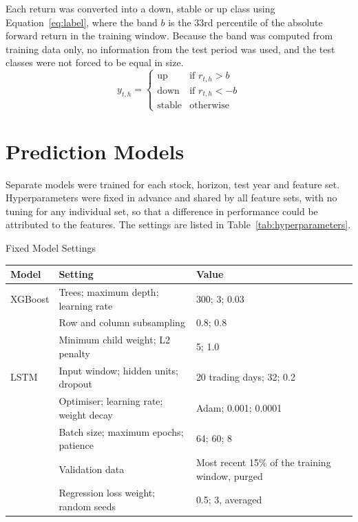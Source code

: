 Each return was converted into a down, stable or up class using Equation~\ref{eq:label}, where the band $b$ is the 33rd percentile of the absolute forward return in the training window. Because the band was computed from training data only, no information from the test period was used, and the test classes were not forced to be equal in size.
\begin{equation}
y_{t,h} =
\begin{cases}
\text{up} & \text{if } r_{t,h} > b \\
\text{down} & \text{if } r_{t,h} < -b \\
\text{stable} & \text{otherwise}
\end{cases}
\label{eq:label}
\end{equation}

\section{Prediction Models}
\label{sec:models}
Separate models were trained for each stock, horizon, test year and feature set. Hyperparameters were fixed in advance and shared by all feature sets, with no tuning for any individual set, so that a difference in performance could be attributed to the features. The settings are listed in Table~\ref{tab:hyperparameters}.

\begin{utptable}{Fixed Model Settings}
\label{tab:hyperparameters}
\begin{tabular}{@{}P{1.9cm}P{5.4cm}P{6.3cm}@{}}
\toprule
\textbf{Model} & \textbf{Setting} & \textbf{Value} \\
\midrule
XGBoost & Trees; maximum depth; learning rate & 300; 3; 0.03 \\
 & Row and column subsampling & 0.8; 0.8 \\
 & Minimum child weight; L2 penalty & 5; 1.0 \\
\midrule
LSTM & Input window; hidden units; dropout & 20 trading days; 32; 0.2 \\
 & Optimiser; learning rate; weight decay & Adam; 0.001; 0.0001 \\
 & Batch size; maximum epochs; patience & 64; 60; 8 \\
 & Validation data & Most recent 15\% of the training window, purged \\
 & Regression loss weight; random seeds & 0.5; 3, averaged \\
\bottomrule
\end{tabular}
\end{utptable}

